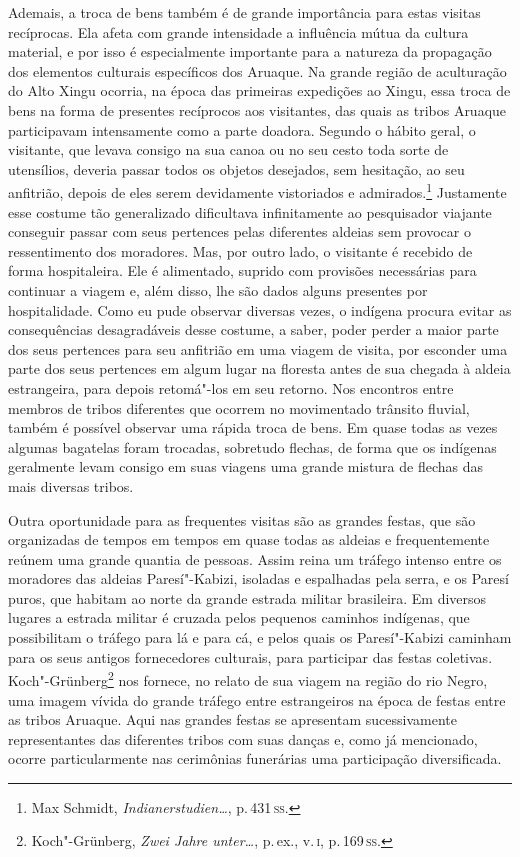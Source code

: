 Ademais, a troca de bens também é de grande importância para estas
visitas recíprocas. Ela afeta com grande intensidade a influência mútua
da cultura material, e por isso é especialmente importante para a
natureza da propagação dos elementos culturais específicos dos Aruaque.
Na grande região de aculturação do Alto Xingu ocorria, na época das
primeiras expedições ao Xingu, essa troca de bens na forma de presentes
recíprocos aos visitantes, das quais as tribos Aruaque participavam
intensamente como a parte doadora. Segundo o hábito geral, o
visitante, que levava consigo na sua canoa ou no seu cesto toda sorte
de utensílios, deveria passar todos os objetos desejados, sem hesitação,
ao seu anfitrião, depois de eles serem devidamente vistoriados e
admirados.\footnote{Max Schmidt, \textit{Indianerstudien\ldots}, p.\,431\,\textsc{ss}.} Justamente esse costume tão
generalizado dificultava infinitamente ao pesquisador viajante conseguir
passar com seus pertences pelas diferentes aldeias sem provocar o
ressentimento dos moradores. Mas, por outro lado, o visitante é recebido
de forma hospitaleira. Ele é alimentado, suprido com provisões
necessárias para continuar a viagem e, além disso, lhe são dados alguns
presentes por hospitalidade. Como eu pude observar diversas vezes, o
indígena procura evitar as consequências desagradáveis desse costume, a
saber, poder perder a maior parte dos seus pertences para seu anfitrião
em uma viagem de visita, por esconder uma parte dos seus pertences em
algum lugar na floresta antes de sua chegada à aldeia estrangeira, para
depois retomá"-los em seu retorno. Nos encontros entre membros de tribos
diferentes que ocorrem no movimentado trânsito fluvial, também é
possível observar uma rápida troca de bens. Em quase todas as vezes
algumas bagatelas foram trocadas, sobretudo flechas, de forma que os
indígenas geralmente levam consigo em suas viagens uma grande mistura de
flechas das mais diversas tribos.

{Outra oportunidade para as frequentes visitas são as grandes festas,
que são organizadas de tempos em tempos em quase todas as aldeias e
frequentemente reúnem uma grande quantia de pessoas. Assim reina um
tráfego intenso entre os moradores das aldeias Paresí"-Kabizi, isoladas e
espalhadas pela serra, e os Paresí puros, que habitam ao norte da grande
estrada militar brasileira. Em diversos lugares a estrada militar é
cruzada pelos pequenos caminhos indígenas, que possibilitam o tráfego
para lá e para cá, e pelos quais os Paresí"-Kabizi caminham para os seus
antigos fornecedores culturais, para participar das festas coletivas.
Koch"-Grünberg\footnote{Koch"-Grünberg, \textit{Zwei Jahre unter\ldots}, p.\,ex., v.\,\textsc{i}, p.\,169\,\textsc{ss}.} nos fornece, no relato de sua
viagem na região do rio Negro, uma imagem vívida do grande tráfego
entre estrangeiros na época de festas entre as tribos Aruaque. Aqui nas
grandes festas se apresentam sucessivamente representantes das
diferentes tribos com suas danças e, como já mencionado, ocorre
particularmente nas cerimônias funerárias uma participação
diversificada.}

